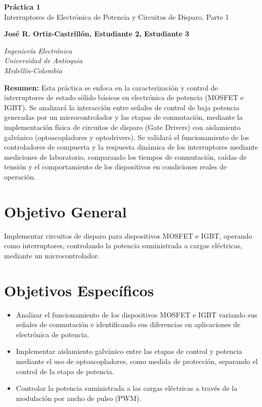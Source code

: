 \documentclass[12pt]{article}
\newcommand{\estudiantes}{José R. Ortiz-Castrillón, Estudiante 2, Estudiante 3}
\begin{document}
\begin{center}
    {\Huge \textcolor{tituloazul}{\textbf{Práctica 1}\\ Interruptores de Electrónica de Potencia y Circuitos de Disparo. Parte 1}}
    \vspace{0.6cm}

    {\textbf{\estudiantes}}
    \vspace{0.5cm}

    \textit{Ingeniería Electrónica}\\
    \textit{Universidad de Antioquia}\\
    \textit{Medellín-Colombia}
\end{center}

\vspace{0.5cm}

\noindent\textcolor{tituloazul}{\textbf{Resumen:}} Esta práctica se enfoca en la caracterización y control de interruptores de estado sólido básicos en electrónica de potencia (MOSFET e IGBT). Se analizará la interacción entre señales de control de baja potencia generadas por un microcontrolador y las etapas de conmutación, mediante la implementación física de circuitos de disparo (Gate Drivers) con aislamiento galvánico (optoacopladores y optodrivers). Se validará el funcionamiento de los controladores de compuerta  y la respuesta dinámica de los interruptores mediante mediciones de laboratorio, comparando los tiempos de conmutación, caídas de tensión y el comportamiento de los dispositivos en condiciones reales de operación.


\section{Objetivo General}
Implementar circuitos de disparo para dispositivos MOSFET e IGBT, operando como interruptores, controlando la potencia suministrada a cargas eléctricas, mediante un microcontrolador.

\section{Objetivos Específicos}
    \begin{itemize}
        \item Analizar el funcionamiento de los dispositivos MOSFET e IGBT variando sus señales de conmutación e identificando sus diferencias en aplicaciones de electrónica de potencia.
        \item Implementar aislamiento galvánico entre las etapas de control y potencia mediante el uso de optoacopladores, como medida de protección, separando el control de la etapa de potencia.
        \item Controlar la potencia suministrada a las cargas eléctricas a través de la modulación por ancho de pulso (PWM).
    \end{itemize}
\end{document}
